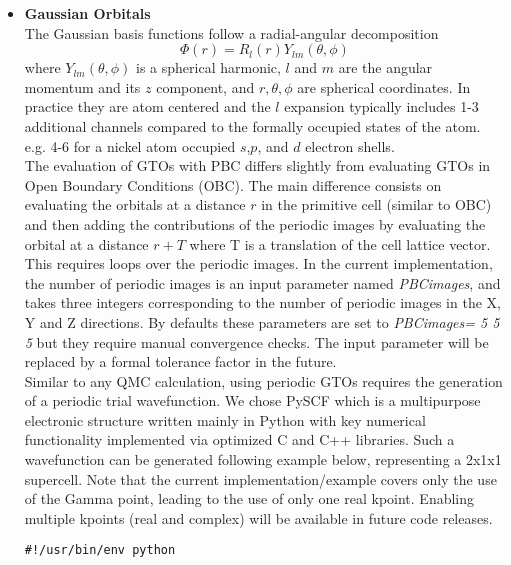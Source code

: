 \begin{itemize}
 \item \textbf{Gaussian Orbitals}\\
 The Gaussian basis functions follow a radial-angular decomposition
\begin{equation}
     \Phi ({r} )=R_{l}(r)Y_{lm}(\theta ,\phi )
\end{equation}
where $ Y_{{lm}}(\theta ,\phi )$ is a spherical harmonic, $l$ and $m$ are the angular momentum and its $z$ component, and $r,\theta ,\phi $ are spherical coordinates. In practice they are atom centered and the $l$ expansion typically includes 1-3 additional channels compared to the formally occupied states of the atom. e.g. 4-6 for a nickel atom occupied $s$,$p$, and $d$ electron shells.\\

The evaluation of GTOs with PBC differs slightly from evaluating GTOs in Open Boundary Conditions (OBC). The main difference consists on evaluating the orbitals at a distance $r$ in the primitive cell (similar to OBC) and then adding the contributions of the periodic images by evaluating the orbital at a distance $r+T$ where T is a translation of the cell lattice vector. This requires loops over the periodic images. In the current implementation, the number of periodic images is an input parameter named \textit{PBCimages}, and takes three integers corresponding to the number of periodic images in the X, Y and Z directions. By defaults these parameters are set to \textit{PBCimages= 5 5 5} but they require manual convergence checks. The input parameter will be replaced by a formal tolerance factor in the future.\\

Similar to any QMC calculation, using periodic GTOs requires the generation of a periodic trial wavefunction. We chose PySCF which is a multipurpose electronic structure written mainly in Python with key numerical functionality implemented via optimized C and C++ libraries. Such a wavefunction can be generated following example below, representing a 2x1x1 supercell. Note that the current implementation/example covers only the use of the Gamma point, leading to the use of only one real kpoint. Enabling multiple kpoints (real and complex) will be available in future code releases. 

\begin{lstlisting}[caption=The following is an example PySCF input file for single kpoint calculation for a 2x1x1 Carbon cell.]
#!/usr/bin/env python


\end{lstlisting}
\end{itemize}
